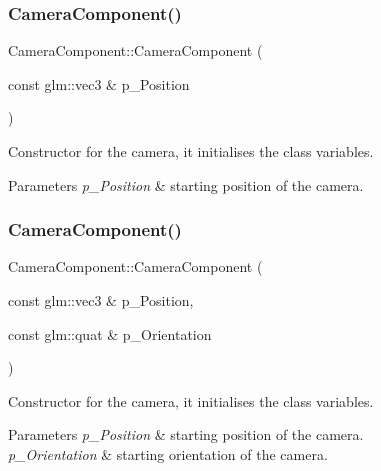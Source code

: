 \subsubsection{\texorpdfstring{CameraComponent()}{CameraComponent()}\hspace{0.1cm}{\footnotesize\ttfamily [1/2]}}
{\footnotesize\ttfamily Camera\+Component\+::\+Camera\+Component (\begin{DoxyParamCaption}\item[{const glm\+::vec3 \&}]{p\+\_\+\+Position }\end{DoxyParamCaption})\hspace{0.3cm}{\ttfamily [inline]}}



Constructor for the camera, it initialises the class\textquotesingle{} variables. 


\begin{DoxyParams}{Parameters}
{\em p\+\_\+\+Position} & starting position of the camera. \\
\hline
\end{DoxyParams}
\mbox{\label{class_camera_component_a5011cce0bdfe8ffba0e59922771f65e8}} 
\subsubsection{\texorpdfstring{CameraComponent()}{CameraComponent()}\hspace{0.1cm}{\footnotesize\ttfamily [2/2]}}
{\footnotesize\ttfamily Camera\+Component\+::\+Camera\+Component (\begin{DoxyParamCaption}\item[{const glm\+::vec3 \&}]{p\+\_\+\+Position,  }\item[{const glm\+::quat \&}]{p\+\_\+\+Orientation }\end{DoxyParamCaption})\hspace{0.3cm}{\ttfamily [inline]}}



Constructor for the camera, it initialises the class\textquotesingle{} variables. 


\begin{DoxyParams}{Parameters}
{\em p\+\_\+\+Position} & starting position of the camera. \\
\hline
{\em p\+\_\+\+Orientation} & starting orientation of the camera. \\
\hline
\end{DoxyParams}


